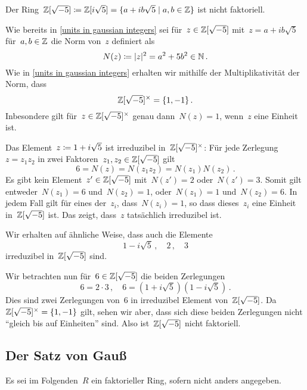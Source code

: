 \begin{example}
  Der Ring~$\Integer[\sqrt{-5}] \defined \Integer[i \sqrt{5}] = \{ a + i b \sqrt{5} \suchthat a, b \in \Integer \}$ ist nicht faktoriell.

  Wie bereits in \cref{units in gaussian integers} sei für~$z \in \mathbb{Z}[\sqrt{-5}]$ mit~$z = a + i b \sqrt{5}$ für~$a, b \in \mathbb{Z}$ die Norm von~$z$ definiert als
  \[
    N(z)
    \coloneqq
    \lvert z\rvert^2
    =
    a^2 + 5 b^2
    \in
    \mathbb{N} \,.
  \]
  Wie in \cref{units in gaussian integers} erhalten wir mithilfe der Multiplikativität der Norm, dass
  \[
    \mathbb{Z}[\sqrt{-5}]^\times
    =
    \{ 1, -1 \} \,.
  \]
  Inbesondere gilt für~$z \in \mathbb{Z}[\sqrt{-5}]^\times$ genau dann~$N(z) = 1$, wenn~$z$ eine Einheit ist.

  Das Element~$z \coloneqq 1 + i \sqrt{5}$ ist irreduzibel in~$\mathbb{Z}[\sqrt{-5}]^\times$:
  Für jede Zerlegung~$z = z_1 z_2$ in zwei Faktoren~$z_1, z_2 \in \mathbb{Z}[\sqrt{-5}]$ gilt
  \[
    6
    =
    N(z)
    =
    N(z_1 z_2)
    =
    N(z_1) N(z_2) \,.
  \]
  Es gibt kein Element~$z' \in \mathbb{Z}[\sqrt{-5}]$ mit~$N(z') = 2$ oder~$N(z') = 3$.
  Somit gilt entweder~$N(z_1) = 6$ und~$N(z_2) = 1$, oder~$N(z_1) = 1$ und~$N(z_2) = 6$.
  In jedem Fall gilt für eines der~$z_i$, dass~$N(z_i) = 1$, so dass dieses~$z_i$ eine Einheit in~$\mathbb{Z}[\sqrt{-5}]$ ist.
  Das zeigt, dass~$z$ tatsächlich irreduzibel ist.

  Wir erhalten auf ähnliche Weise, dass auch die Elemente
  \[
    1 - i \sqrt{5} \,,
    \quad
    2 \,,
    \quad
    3
  \]
  irreduzibel in~$\mathbb{Z}[\sqrt{-5}]$ sind.

  Wir betrachten nun für~$6 \in \mathbb{Z}[\sqrt{-5}]$ die beiden Zerlegungen
  \[
    6 = 2 \cdot 3 \,,
    \quad
    6 = ( 1 + i \sqrt{5} ) ( 1 - i \sqrt{5} ) \,.
  \]
  Dies sind zwei Zerlegungen von~$6$ in irreduzibel Element von~$\mathbb{Z}[\sqrt{-5}]$.
  Da~$\mathbb{Z}[\sqrt{-5}]^\times = \{1, -1\}$ gilt, sehen wir aber, dass sich diese beiden Zerlegungen nicht \enquote{gleich bis auf Einheiten} sind.
  Also ist~$\mathbb{Z}[\sqrt{-5}]$ nicht faktoriell.
\end{example}



\subsection{Der Satz von Gauß}

\begin{convention}
  Es sei im Folgenden~$R$ ein faktorieller Ring, sofern nicht anders angegeben.
\end{convention}


